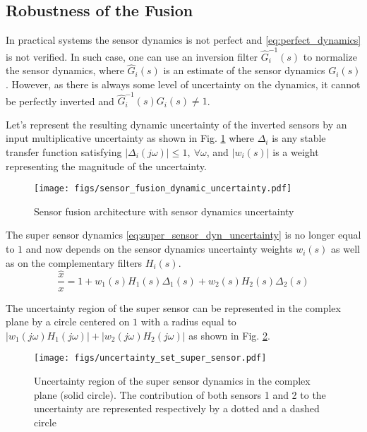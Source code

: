 \documentclass[conference]{IEEEtran}
\begin{document}
\subsection{Robustness of the Fusion}
\label{sec:org60ae644}
\label{sec:fusion_robustness}

In practical systems the sensor dynamics is not perfect and \eqref{eq:perfect_dynamics} is not verified.
In such case, one can use an inversion filter \(\hat{G}_i^{-1}(s)\) to normalize the sensor dynamics, where \(\hat{G}_i(s)\) is an estimate of the sensor dynamics \(G_i(s)\).
However, as there is always some level of uncertainty on the dynamics, it cannot be perfectly inverted and \(\hat{G}_i^{-1}(s) G_i(s) \neq 1\).

Let's represent the resulting dynamic uncertainty of the inverted sensors by an input multiplicative uncertainty as shown in Fig. \ref{fig:sensor_fusion_dynamic_uncertainty} where \(\Delta_i\) is any stable transfer function satisfying \(|\Delta_i(j\omega)| \le 1,\ \forall\omega\), and \(|w_i(s)|\) is a weight representing the magnitude of the uncertainty.

\begin{figure}[htbp]
\centering
\texttt{[image: figs/sensor\_fusion\_dynamic\_uncertainty.pdf]}
\caption{\label{fig:sensor_fusion_dynamic_uncertainty}
Sensor fusion architecture with sensor dynamics uncertainty}
\end{figure}

The super sensor dynamics \eqref{eq:super_sensor_dyn_uncertainty} is no longer equal to \(1\) and now depends on the sensor dynamics uncertainty weights \(w_i(s)\) as well as on the complementary filters \(H_i(s)\).
\begin{equation}
\label{eq:super_sensor_dyn_uncertainty}
  \frac{\hat{x}}{x} = 1 + w_1(s) H_1(s) \Delta_1(s) + w_2(s) H_2(s) \Delta_2(s)
\end{equation}

The uncertainty region of the super sensor can be represented in the complex plane by a circle centered on \(1\) with a radius equal to \(|w_1(j\omega) H_1(j\omega)| + |w_2(j\omega) H_2(j\omega)|\) as shown in Fig. \ref{fig:uncertainty_set_super_sensor}.

\begin{figure}[htbp]
\centering
\texttt{[image: figs/uncertainty\_set\_super\_sensor.pdf]}
\caption{\label{fig:uncertainty_set_super_sensor}
Uncertainty region of the super sensor dynamics in the complex plane (solid circle). The contribution of both sensors 1 and 2 to the uncertainty are represented respectively by a dotted and a dashed circle}
\end{figure}
\end{document}
